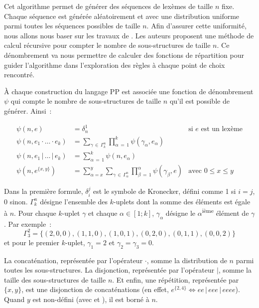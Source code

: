 Cet algorithme permet de générer des séquences de lexèmes de taille $n$ fixe.
Chaque séquence est générée aléatoirement et avec une distribution uniforme
parmi toutes les séquences possibles de taille $n$. Afin d'assurer cette
uniformité, nous allons nous baser sur les travaux de . Les
auteurs proposent une méthode de calcul récursive pour compter le nombre de
sous-structures de taille $n$. Ce dénombrement va nous permettre de calculer des
fonctions de répartition pour guider l'algorithme dans l'exploration des règles
à chaque point de choix rencontré.

À chaque construction du langage PP est associée une fonction de dénombrement
$\psi$ qui compte le nombre de sous-structures de taille $n$ qu'il est possible
de générer. Ainsi~:

\begin{align*}
%
\psi(n, e) & =
    \delta_n^1
    &
    \text{si $e$ est un lexème}
    \\
%
\psi(n, e_1 \cdot \dotso \cdot e_k) & =
    \sum_{\gamma \,\in\, \Gamma_k^n}
    \prod_{\alpha \,=\, 1}^k
    \psi(\gamma_\alpha, e_\alpha)
    \\
%
\psi(n, e_1 \,\vert\, \dots \,\vert\, e_k) & =
    \sum_{\alpha \,=\, 1}^k
    \psi(n, e_\alpha)
    \\
%
\psi(n, e^{\{x, y\}}) & =
    \sum_{\alpha = x}^y
    \sum_{\gamma \,\in\, \Gamma_\alpha^n}
    \prod_{\beta \,=\, 1}^\alpha
    \psi(\gamma_\beta, e)
    &
    \text{avec $0 \leq x \leq y$}
%
\end{align*}

Dans la première formule, $\delta_i^j$ est le symbole de Kronecker, défini
comme 1 si $i = j$, 0 sinon. $\Gamma_k^n$ désigne l'ensemble des $k$-uplets dont
la somme des éléments est égale à $n$. Pour chaque $k$-uplet $\gamma$ et chaque
$\alpha \in [1; k]$, $\gamma_\alpha$ désigne le $\alpha$\textsuperscript{ième}
élément de $\gamma$.
%
Par exemple~:
%
$$\Gamma_3^2 = \{(2, 0, 0), (1, 1, 0), (1, 0, 1), (0, 2, 0), (0, 1, 1), (0, 0,
2)\}$$
%
et pour le premier $k$-uplet, $\gamma_1 = 2$ et $\gamma_2 = \gamma_3 = 0$.

La concaténation, représentée par l'opérateur $\cdot$, somme la distribution de
$n$ parmi toutes les sous-structures. La disjonction, représentée par
l'opérateur $\vert$, somme la taille des sous-structures de taille $n$. Et
enfin, une répétition, représentée par $\{x, y\}$, est une disjonction de
concaténations (en effet, $e^{\{2,4\}} \Longleftrightarrow ee \,\vert\, eee
\,\vert\, eeee$). Quand $y$ est non-défini (avec \code{*} et \code{+}), il est
borné à $n$.

